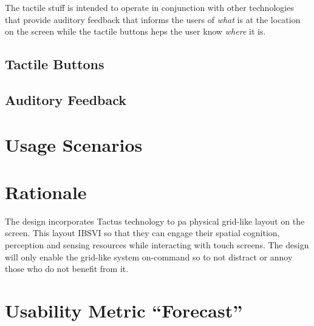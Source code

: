 \documentclass[11pt]{article}
\begin{document}
The tactile stuff is intended to operate in conjunction with other technologies that provide auditory feedback that informs the users of \textit{what} is at the location on the screen while the tactile buttons heps the user know \textit{where} it is. 

\subsection{Tactile Buttons}

\subsection{Auditory Feedback}


\section{Usage Scenarios}

\section{Rationale}
The design incorporates Tactus technology to pa physical grid-like layout on the screen. This layout IBSVI so that they can engage their spatial cognition, perception and sensing resources while interacting with touch screens. The design will only enable the grid-like system on-command so to not distract or annoy those who do not benefit from it.

\section{Usability Metric ``Forecast''}
\clearpage


{}

\end{document}
